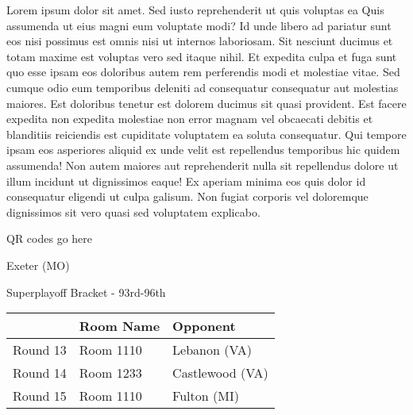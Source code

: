 \documentclass{article}%
\begin{document}
\vspace*{8pt}%
\linebreak%
\newline%
\newline%
Lorem ipsum dolor sit amet. Sed iusto reprehenderit ut quis voluptas ea Quis assumenda ut eius magni eum voluptate modi? Id unde libero ad pariatur sunt eos nisi possimus est omnis nisi ut internos laboriosam. Sit nesciunt ducimus et totam maxime est voluptas vero sed itaque nihil. Et expedita culpa et fuga sunt quo esse ipsam eos doloribus autem rem perferendis modi et molestiae vitae.\newline%
\newline%
Sed cumque odio eum temporibus deleniti ad consequatur consequatur aut molestias maiores. Est doloribus tenetur est dolorem ducimus sit quasi provident. Est facere expedita non expedita molestiae non error magnam vel obcaecati debitis et blanditiis reiciendis est cupiditate voluptatem ea soluta consequatur. Qui tempore ipsam eos asperiores aliquid ex unde velit est repellendus temporibus hic quidem assumenda!\newline%
\newline%
Non autem maiores aut reprehenderit nulla sit repellendus dolore ut illum incidunt ut dignissimos eaque! Ex aperiam minima eos quis dolor id consequatur eligendi ut culpa galisum. Non fugiat corporis vel doloremque dignissimos sit vero quasi sed voluptatem explicabo.\newline%
\newline%
%
\vspace*{30pt}%
\begin{center}%
\begin{Huge}%
QR codes go here%
\end{Huge}%
\end{center}%
\newpage%
\begin{center}%
\begin{Huge}%
Exeter (MO)%
\end{Huge}%
\vspace*{8pt}%
\linebreak%
\begin{Large}%
Superplayoff Bracket {-} 93rd{-}96th%
\end{Large}%
\end{center}%
%
\begin{tabularx}{\textwidth}{|c|Y|Y|}%
\hline%
&Room Name&Opponent\\%
\hline%
Round 13&Room 1110&Lebanon (VA)\\%
Round 14&Room 1233&Castlewood (VA)\\%
Round 15&Room 1110&Fulton (MI)\\%
\hline%
\end{tabularx}%
\end{document}

